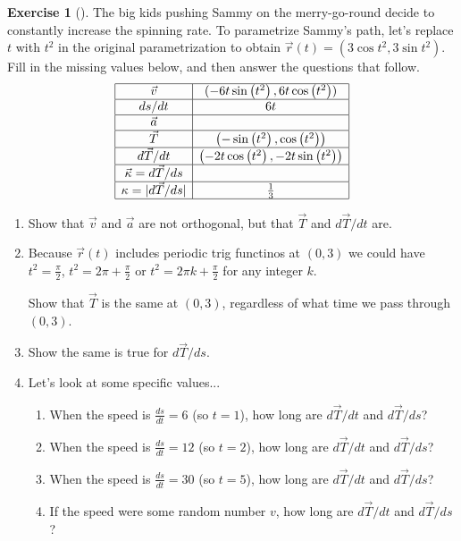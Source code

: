 \documentclass[10pt,]{book}
\theoremstyle{plain}
\theoremstyle{definition}
\theoremstyle{definition}
\theoremstyle{definition}
\theoremstyle{definition}
\newtheorem{exploration}[project]{Exercise}
\theoremstyle{definition}
\numberwithin{equation}{section}
\newcommand{\amp}{&}
\begin{document}
\begin{exploration}[]\label{exploration-171}
The big kids pushing Sammy on the merry-go-round decide to constantly increase the spinning rate. To parametrize Sammy's path, let's replace \(t\) with \(t^2\) in the original parametrization to obtain \(\vec r(t) = (3\cos t^2, 3\sin t^2)\). Fill in the missing values below, and then answer the questions that follow.%
\begin{equation*}
\begin{array}{|c|c|}\hline
\vec v \amp  ( -6 t \sin \left(t^2\right),6 t \cos \left(t^2\right) ) \\\hline
ds/dt \amp  6 t \\\hline
\vec a \amp  
\\\hline
\vec T \amp  \left(-\sin \left(t^2\right),\cos \left(t^2\right)\right) 
\\\hline
d\vec T/dt \amp  \left(-2 t \cos \left(t^2\right),-2 t \sin \left(t^2\right)\right)\\\hline
\vec \kappa = d\vec T/ds \amp  
\\\hline
\kappa =|d\vec T/ds| \amp  \frac{1}{3} \\\hline
\end{array}
\end{equation*}
%
\begin{enumerate}[font=\bfseries,label=(\alph*),ref=\alph*]
\item\label{task-417} Show that \(\vec v\) and \(\vec a\) are not orthogonal, but that \(\vec T\) and \(d\vec T/dt\) are.%
\item\label{task-418} Because \(\vec r (t)\) includes periodic trig functinos at \((0,3)\) we could have \(t^2 = \frac{\pi}{2}\), \(t^2=2\pi+\frac{\pi}{2}\) or \(t^2=2\pi k + \frac{\pi}{2}\) for any integer \(k\).%
\par
Show that \(\vec T\) is the same at \((0,3)\), regardless of what time we pass through \((0,3)\).%
\item\label{task-419} Show the same is true for \(d\vec T/ds\).%
\item\label{task-420} Let's look at some specific values...%
\begin{enumerate}[font=\bfseries,label=(\roman*),ref=\theenumi.\roman*]
\item\label{task-421} When the speed is \(\frac{ds}{dt}=6\) (so \(t=1\)), how long are \(d\vec T/dt\) and \(d\vec T/ds\)?%
\item\label{task-422} When the speed is \(\frac{ds}{dt}=12\) (so \(t=2\)), how long are \(d\vec T/dt\) and \(d\vec T/ds\)?%
\item\label{task-423} When the speed is \(\frac{ds}{dt}=30\) (so \(t=5\)), how long are \(d\vec T/dt\) and \(d\vec T/ds\)?%
\item\label{task-424} If the speed were some random number \(v\), how long are \(d\vec T/dt\) and \(d\vec T/ds\)?%
\end{enumerate}
\end{enumerate}
\end{exploration}
\end{document}

